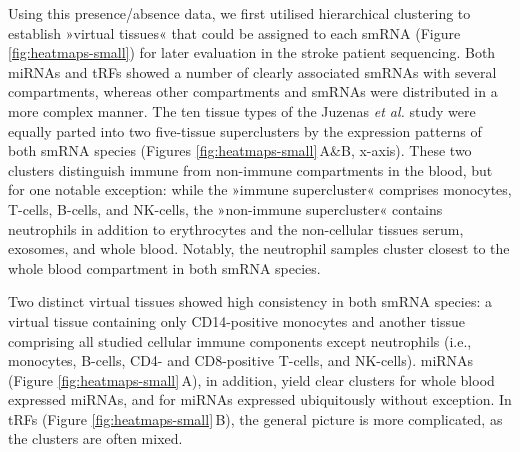Using this presence/absence data, we first utilised hierarchical clustering to establish »virtual tissues« that could be assigned to each smRNA (Figure \ref{fig:heatmaps-small}) for later evaluation in the stroke patient sequencing. Both miRNAs and tRFs showed a number of clearly associated smRNAs with several compartments, whereas other compartments and smRNAs were distributed in a more complex manner. The ten tissue types of the Juzenas \emph{et al.}\cite{Juzenas2017} study were equally parted into two five-tissue superclusters by the expression patterns of both smRNA species (Figures \ref{fig:heatmaps-small}\,A\&B, x-axis). These two clusters distinguish immune from non-immune compartments in the blood, but for one notable exception: while the »immune supercluster« comprises monocytes, T-cells, B-cells, and NK-cells, the »non-immune supercluster« contains neutrophils in addition to erythrocytes and the non-cellular tissues serum, exosomes, and whole blood. Notably, the neutrophil samples cluster closest to the whole blood compartment in both smRNA species.

Two distinct virtual tissues showed high consistency in both smRNA species: a virtual tissue containing only CD14-positive monocytes and another tissue comprising all studied cellular immune components except neutrophils (i.e., monocytes, B-cells, CD4- and CD8-positive T-cells, and NK-cells). miRNAs (Figure \ref{fig:heatmaps-small}\,A), in addition, yield clear clusters for whole blood expressed miRNAs, and for miRNAs expressed ubiquitously without exception. In tRFs (Figure \ref{fig:heatmaps-small}\,B), the general picture is more complicated, as the clusters are often mixed.

